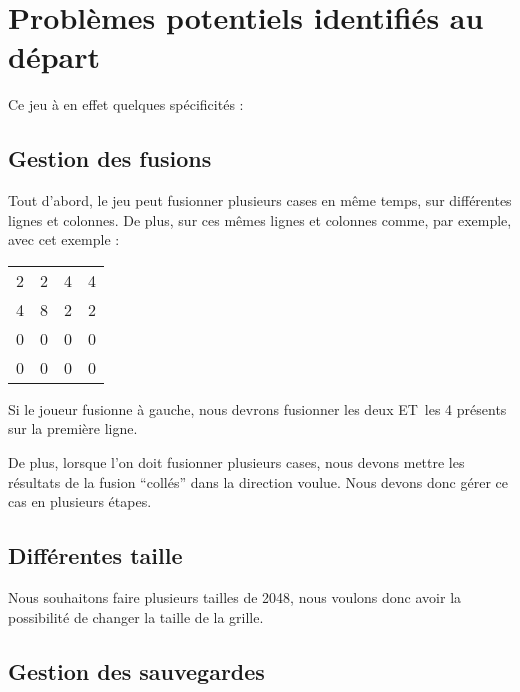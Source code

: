 \documentclass[letter]{article}
\date{\today}
\title{}
\begin{document}





\setcounter{tocdepth}{2}
\tableofcontents

\newpage


\section{Problèmes potentiels identifiés au départ}
\label{sec:org65bcba3}

Ce jeu à en effet quelques spécificités :

\subsection{Gestion des fusions}
\label{sec:org2d499ad}

Tout d'abord, le jeu peut fusionner plusieurs cases en même temps, sur différentes lignes et colonnes. De plus, sur ces mêmes lignes et colonnes comme, par exemple, avec cet exemple :

\begin{center}
\begin{tabular}{rrrr}
2 & 2 & 4 & 4\\
4 & 8 & 2 & 2\\
0 & 0 & 0 & 0\\
0 & 0 & 0 & 0\\
\end{tabular}
\end{center}

Si le joueur fusionne à gauche, nous devrons fusionner les deux ET les 4 présents sur la première ligne.

De plus, lorsque l'on doit fusionner plusieurs cases, nous devons mettre les résultats de la fusion “collés” dans la direction voulue.
Nous devons donc gérer ce cas en plusieurs étapes.

\subsection{Différentes taille}
\label{sec:org1e4672e}

Nous souhaitons faire plusieurs tailles de 2048, nous voulons donc avoir la possibilité de changer la taille de la grille.

\subsection{Gestion des sauvegardes}
\label{sec:orgcf11b20}
\end{document}
